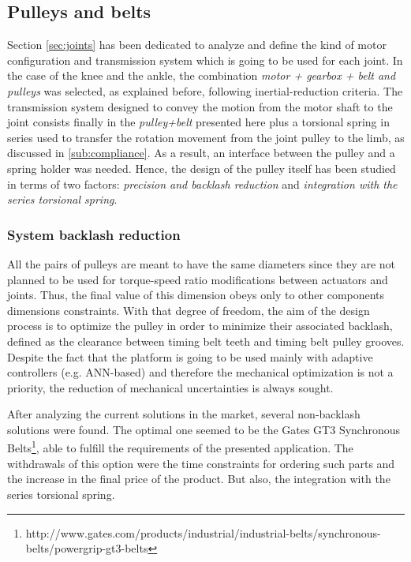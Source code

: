 \subsection{Pulleys and belts} %


\label{sub:pulleys_and_belts}
Section \ref{sec:joints} has been dedicated to analyze and define the kind of motor configuration and transmission system which is going to be used for each joint.
In the case of the knee and the ankle, the combination \textit{motor + gearbox + belt and pulleys} was selected, as explained before, following inertial-reduction criteria.
The transmission system designed to convey the motion from the motor shaft to the joint consists finally in the \textit{pulley+belt} presented here plus a torsional spring in series used to transfer the rotation movement from the joint pulley to the limb, as discussed in \ref{sub:compliance}.
As a result, an interface between the pulley and a spring holder was needed.
Hence, the design of the pulley itself has been studied in terms of two factors: \textit{precision and backlash reduction} and \textit{integration with the series torsional spring}.

\subsubsection{System backlash reduction} %
\label{ssub:precision_and_backlash_reduction}
All the pairs of pulleys are meant to have the same diameters since they are not planned to be used for torque-speed ratio modifications between actuators and joints. 
Thus, the final value of this dimension obeys only to other components dimensions constraints.
With that degree of freedom, the aim of the design process is to optimize the pulley in order to minimize their associated backlash, defined as the clearance between timing belt teeth and timing belt pulley grooves.
Despite the fact that the platform is going to be used mainly with adaptive controllers (e.g. ANN-based) and therefore the mechanical optimization is not a priority, the reduction of mechanical uncertainties is always sought.

After analyzing the current solutions in the market, several non-backlash solutions were found.
The optimal one seemed to be the Gates GT3 Synchronous Belts\footnote{http://www.gates.com/products/industrial/industrial-belts/synchronous-belts/powergrip-gt3-belts}, able to fulfill the requirements of the presented application.
The withdrawals of this option were the time constraints for ordering such parts and the increase in the final price of the product. 
But also, the integration with the series torsional spring.

